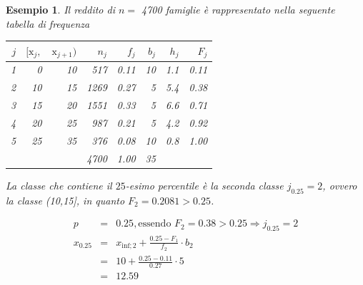 \documentclass[
  11pt,
]{book}
\theoremstyle{mytheoremstyle}
\theoremstyle{mydefstyle}
\newtheorem{example}{{Esempio}}[section]
\begin{document}
\begin{example}
\leavevmode

Il reddito di \(n=\) 4700 famiglie
è rappresentato nella seguente tabella di frequenza

\begin{table}[H]
\centering
\begin{tabular}{rrrrrrrr}
\toprule
$j$ & $[\text{x}_j,$ & $\text{x}_{j+1})$ & $n_j$ & $f_j$ & $b_j$ & $h_j$ & $F_j$\\
\midrule
1 & 0 & 10 & 517 & 0.11 & 10 & 1.1 & 0.11\\
2 & 10 & 15 & 1269 & 0.27 & 5 & 5.4 & 0.38\\
3 & 15 & 20 & 1551 & 0.33 & 5 & 6.6 & 0.71\\
4 & 20 & 25 & 987 & 0.21 & 5 & 4.2 & 0.92\\
5 & 25 & 35 & 376 & 0.08 & 10 & 0.8 & 1.00\\
 &  &  & 4700 & 1.00 & 35 &  & \\
\bottomrule
\end{tabular}
\end{table}

La classe che contiene il \(25\)-esimo percentile è la seconda classe \(j_{0.25}=2\), ovvero la classe (10,15{]}, in quanto \(F_2=0.2081>0.25\).

\begin{eqnarray*}
  p &=&  0.25 , \text{essendo }F_{ 2 }= 0.38  > 0.25  \Rightarrow j_{ 0.25 }= 2 \\
  x_{ 0.25 } &=& x_{\text{inf}; 2 } + \frac{ { 0.25 } - F_{ 1 }} {f_{ 2 }} \cdot b_{ 2 } \\
            &=&  10  + \frac {{ 0.25 } -  0.11 } { 0.27 } \cdot  5  \\
            &=&  12.59 
\end{eqnarray*}

\end{example}
\end{document}
